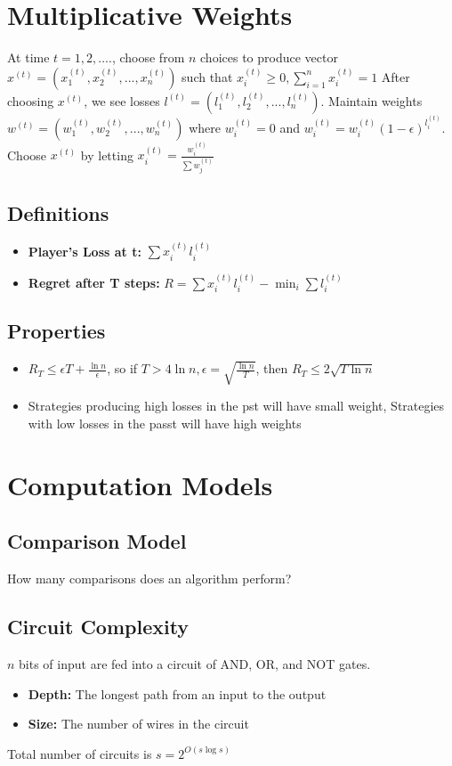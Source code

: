 \documentclass{article}
\begin{document}
\section*{Multiplicative Weights}
At time $t=1, 2, ....$, choose from $n$ choices to produce vector $x^{(t)}=(x_1^{(t)},x_2^{(t)},...,x_n^{(t)})$ such that $x_i^{(t)}\geq 0, \sum_{i=1}^nx_i^{(t)}=1$
After choosing $x^{(t)}$, we see losses $l^{(t)}=(l_1^{(t)},l_2^{(t)},...,l_n^{(t)})$. Maintain weights $w^{(t)}=(w_1^{(t)},w_2^{(t)},...,w_n^{(t)})$ where $w_i^{(t)}=0$ and $w_i^{(t)}=w_i^{(t)}(1-\epsilon)^{l_i^{(t)}}$.
Choose $x^{(t)}$ by letting $x_i^{(t)} = \frac{w_i^{(t)}}{\sum w_j^{(t)}}$
\subsection*{Definitions}
\begin{itemize}
    \item \textbf{Player's Loss at t:} $\sum x_i^{(t)}l_i^{(t)}$
    \item \textbf{Regret after T steps:} $R = \sum x_i^{(t)}l_i^{(t)} - \min_i \sum l_i^{(t)}$
\end{itemize}
\subsection*{Properties}
\begin{itemize}
    \item $R_T \leq \epsilon T + \frac{\ln n}{\epsilon}$, so if $T > 4 \ln n, \epsilon=\sqrt{\frac{\ln n }{T}}$, then $R_T \leq 2\sqrt{T \ln n}$
    \item Strategies producing high losses in the pst will have small weight, Strategies with low losses in the passt will have high weights
\end{itemize}
\noindent\makebox[\linewidth]{\rule{\textwidth}{0.4pt}}
\section*{Computation Models}
\subsection*{Comparison Model}
How many comparisons does an algorithm perform?
\subsection*{Circuit Complexity}
$n$ bits of input are fed into a circuit of AND, OR, and NOT gates.
\begin{itemize}
    \item \textbf{Depth: } The longest path from an input to the output
    \item \textbf{Size: } The number of wires in the circuit
\end{itemize}
Total number of circuits is $s = 2^{O(s\log s)}$
\end{document}
